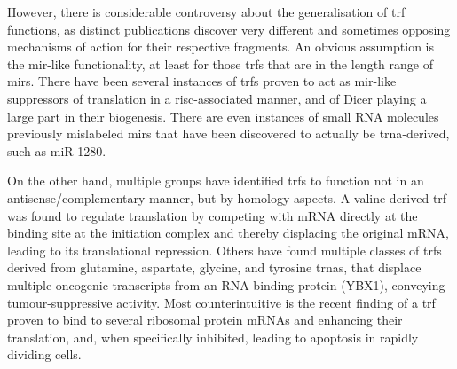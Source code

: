 However, there is considerable controversy about the generalisation of \ac{trf} functions, as distinct publications discover very different and sometimes opposing mechanisms of action for their respective fragments. An obvious assumption is the \ac{mir}-like functionality, at least for those \acp{trf} that are in the length range of \acp{mir}. There have been several instances of \acp{trf} proven to act as \ac{mir}-like suppressors of translation in a \ac{risc}-associated manner\cite{Kumar2014}, and of Dicer playing a large part in their biogenesis\cite{Cole2009}. There are even instances of small RNA molecules previously mislabeled \acp{mir} that have been discovered to actually be \ac{trna}-derived, such as miR-1280\cite{Huang2017}.

On the other hand, multiple groups have identified \acp{trf} to function not in an antisense\-/complementary manner, but by homology aspects. A valine-derived \ac{trf} was found to regulate translation by competing with mRNA directly at the binding site at the initiation complex and thereby displacing the original mRNA, leading to its translational repression\cite{Gebetsberger2017}. Others have found multiple classes of \acp{trf} derived from glutamine, aspartate, glycine, and tyrosine \acp{trna}, that displace multiple oncogenic transcripts from an RNA-binding protein (YBX1), conveying tumour-suppressive activity\cite{Goodarzi2015}. Most counterintuitive is the recent finding of a \ac{trf} proven to bind to several ribosomal protein mRNAs and enhancing their translation, and, when specifically inhibited, leading to apoptosis in rapidly dividing cells\cite{Kim2017}.

